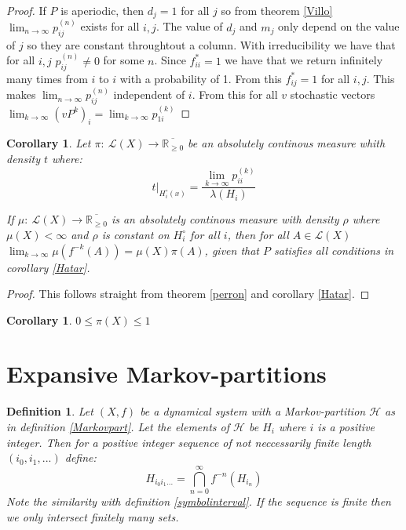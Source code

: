 \documentclass{article}
\newtheorem{cor}[theorem]{Corollary}
\newtheorem{defin}[theorem]{Definition}
\begin{document}
\begin{proof}
If $P$ is aperiodic, then $d_j = 1$ for all $j$ so from theorem \ref{Villo} $\lim_{n\rightarrow \infty} p_{ij}^{(n)}$ exists for all $i,j$. The value of $d_j$ and $m_j$ only depend on the value of $j$ so they are constant throughtout a column. With irreducibility we have that for all $i,j$ $p_{ij}^{(n)}\neq 0$ for some $n$. Since $f^*_{ii} = 1$ we have that we return infinitely many times from $i$ to $i$ with a probability of 1. From this $f_{ij}^* =1$ for all $i, j$. This makes $\lim_{n\rightarrow \infty} p_{ij}^{(n)}$ independent of $i$. From this for all $v$ stochastic vectors $\lim_{k\rightarrow \infty} (vP^k)_i = \lim_{k\rightarrow \infty} p_{1i}^{(k)}$
\end{proof}

\begin{cor} \label{eloszlas}
Let $\pi :\: \mathscr{L}(X) \rightarrow \overline{\mathbb{R}_{\geq 0}} $ be an absolutely continous measure whith density $t$ where:\[
t|_{H_i^\circ(x)} = \frac{\lim_{k\rightarrow \infty} p_{ii}^{(k)}}{\lambda(H_i)} 
\]

If $\mu:\: \mathscr{L}(X)\rightarrow \overline{\mathbb{R}_{\geq 0}} $ is an absolutely continous measure with density $\rho$ where $\mu(X) < \infty$ and $\rho$ is constant on $H_i^\circ$ for all $i$, then for all $A \in \mathscr{L}(X)$ $\lim_{k\rightarrow \infty}\mu(f^{-k}(A)) = \mu(X) \pi(A)$, given that $P$ satisfies all conditions in corollary \ref{Hatar}.
\end{cor}

\begin{proof}
This follows straight from theorem \ref{perron} and corollary \ref{Hatar}.
\end{proof}

\begin{cor}
$0 \leq \pi(X) \leq 1$
\end{cor}

\section{Expansive Markov-partitions} \label{generalmarkov}

\begin{defin}
Let $(X,f)$ be a dynamical system with a Markov-partition $\mathscr{H}$ as in definition \ref{Markovpart}. Let the elements of $\mathscr{H}$ be $H_i$ where $i$ is a positive integer. Then for a positive integer sequence of not neccessarily finite length $(i_0, i_1, ...)$ define:\[
H_{i_0i_1...} = \bigcap_{n=0}^{\infty} f^{-n}(H_{i_n})
\]
Note the similarity with definition \ref{symbolinterval}. If the sequence is finite then we only intersect finitely many sets.
\end{defin}
\end{document}
